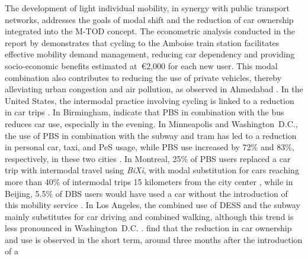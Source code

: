 \begin{refsegment}
The development of light individual mobility, in synergy with public transport networks, addresses the goals of modal shift and the reduction of car ownership integrated into the \acrshort{M-TOD} concept. The econometric analysis conducted in the report by \textcolor{blue}{\textcite[2737]{papon_evaluation_2017}} demonstrates that cycling to the Amboise train station facilitates effective mobility demand management, reducing car dependency and providing socio-economic benefits estimated at~\euro2,000 for each new user. This modal combination also contributes to reducing the use of private vehicles, thereby alleviating urban congestion and air pollution, as observed in Ahmedabad \textcolor{blue}{\autocite[38]{balya_integration_2016}}. In the United States, the intermodal practice involving cycling is linked to a reduction in car trips \textcolor{blue}{\autocite[4269]{bopp_examining_2015}}. In Birmingham, \textcolor{blue}{\textcite[7]{glass_role_2020}} indicate that \acrshort{PBS} in combination with the bus reduces car use, especially in the evening. In Minneapolis and Washington~D.C., the use of \acrshort{PBS} in combination with the subway and tram has led to a reduction in personal car, taxi, and \acrfull{PeS} usage, while \acrshort{PBS} use increased by 72\% and 83\%, respectively, in these two cities \textcolor{blue}{\autocite[317]{martin_evaluating_2014}}. In Montreal, 25\% of \acrshort{PBS} users replaced a car trip with intermodal travel using \textsl{BiXi}, with modal substitution for cars reaching more than 40\% of intermodal trips 15 kilometers from the city center \textcolor{blue}{\autocite[114]{bachand-marleau_much-anticipated_2011}}, while in Beijing, 5.5\% of \acrshort{DBS} users would have used a car without the introduction of this mobility service \textcolor{blue}{\autocite[12]{fan_how_2019}}. In Los Angeles, the combined use of \acrshort{DESS} and the subway mainly substitutes for car driving and combined walking, although this trend is less pronounced in Washington~D.C. \textcolor{blue}{\autocite[7]{yan_evaluating_2023}}. \textcolor{blue}{\textcite[14]{basu_planning_2021}} find that the reduction in car ownership and use is observed in the short term, around three months after the introduction of a 
\end{refsegment}
